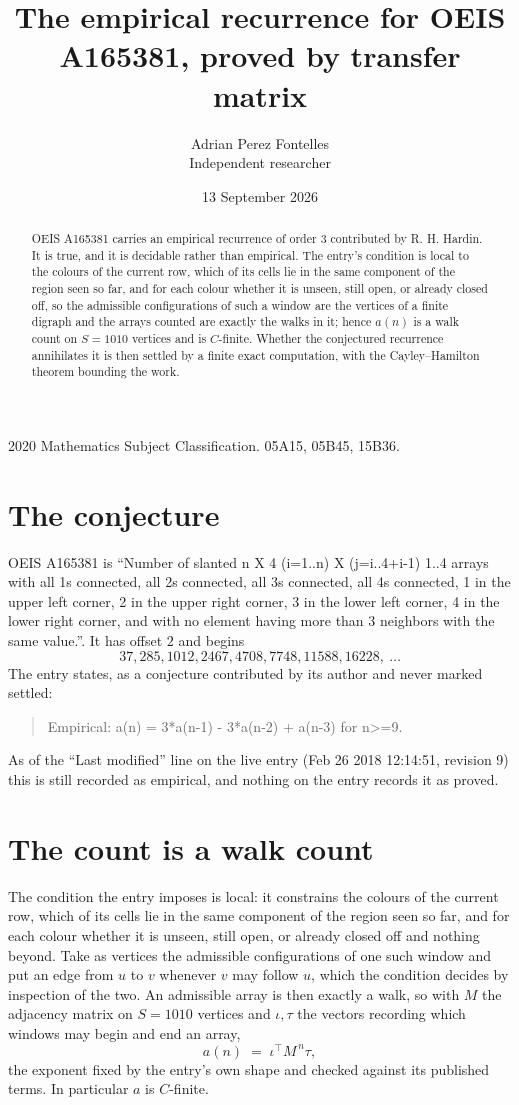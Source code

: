 \documentclass[11pt,a4paper]{article}
\title{The empirical recurrence for OEIS A165381, proved by transfer matrix}
\author{Adrian Perez Fontelles\\ \small Independent researcher}
\date{13 September 2026}
\theoremstyle{plain}
\theoremstyle{definition}
\begin{document}
\maketitle

\begin{abstract}
OEIS A165381 carries an empirical recurrence of order $3$ contributed by R. H. Hardin. It is
true, and it is decidable rather than empirical. The entry's condition is local to the colours of the current row, which of its cells lie in the same component of the region seen so far, and for each colour whether it is unseen, still open, or already closed off, so
the admissible configurations of such a window are the vertices of a finite digraph and the
arrays counted are exactly the walks in it; hence $a(n)$ is a walk count on $S=1010$ vertices
and is $C$-finite. Whether the conjectured recurrence annihilates it is then settled by a
finite exact computation, with the Cayley--Hamilton theorem bounding the work.
\end{abstract}

\noindent\small 2020 Mathematics Subject Classification. 05A15, 05B45, 15B36.\normalsize

\section{The conjecture}

OEIS A165381 is ``Number of slanted n X 4 (i=1..n) X (j=i..4+i-1) 1..4 arrays with all 1s connected, all 2s connected, all 3s connected, all 4s connected, 1 in the upper left corner, 2 in the upper right corner, 3 in the lower left corner, 4 in the lower right corner, and with no element having more than 3 neighbors with the same value.''. It has offset $2$ and begins
\[
37, 285, 1012, 2467, 4708, 7748, 11588, 16228,\ \dots
\]
The entry states, as a conjecture contributed by its author and never marked settled:
\begin{quote}
Empirical: a(n) = 3*a(n-1) - 3*a(n-2) + a(n-3) for n>=9.
\end{quote}
As of the ``Last modified'' line on the live entry (Feb 26 2018 12:14:51, revision 9) this is still
recorded as empirical, and nothing on the entry records it as proved.

\section{The count is a walk count}

The condition the entry imposes is local: it constrains the colours of the current row, which of its cells lie in the same component of the region seen so far, and for each colour whether it is unseen, still open, or already closed off and nothing beyond. Take as
vertices the admissible configurations of one such window and put an edge from $u$ to $v$
whenever $v$ may follow $u$, which the condition decides by inspection of the two. An
admissible array is then exactly a walk, so with $M$ the adjacency matrix on $S=1010$ vertices
and $\iota,\tau$ the vectors recording which windows may begin and end an array,
\[
a(n)\;=\;\iota^{\!\top}M^{\,n}\tau ,
\]
the exponent fixed by the entry's own shape and checked against its published terms. In
particular $a$ is $C$-finite.
\end{document}
